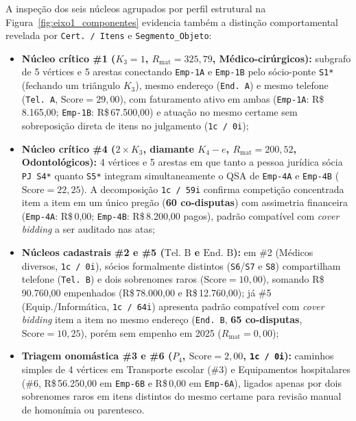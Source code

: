 A inspeção dos seis núcleos agrupados por perfil estrutural na Figura~\ref{fig:eixo1_componentes} evidencia também a distinção comportamental revelada por \texttt{Cert.~/~Itens} e \texttt{Segmento\_\allowbreak Objeto}:
\begin{itemize}
  \item \textbf{Núcleo crítico \#1 ($K_3=1$, $R_{\text{mat}}=325{,}79$, Médico-cirúrgicos):} subgrafo de 5 vértices e 5 arestas conectando \texttt{Emp-1A} e \texttt{Emp-1B} pelo sócio-ponte \texttt{S1*} (fechando um triângulo $K_3$), mesmo endereço (\texttt{End.~A}) e mesmo telefone (\texttt{Tel.~A}, $\text{Score}=29{,}00$), com faturamento ativo em ambas (\texttt{Emp-1A}: R\$\,8.165,00; \texttt{Emp-1B}: R\$\,67.500,00) e atuação no mesmo certame sem sobreposição direta de itens no julgamento (\texttt{1c / 0i});
  \item \textbf{Núcleo crítico \#4 ($2\times K_3$, diamante $K_4-e$, $R_{\text{mat}}=200{,}52$, Odontológicos):} 4 vértices e 5 arestas em que tanto a pessoa jurídica sócia \texttt{PJ S4*} quanto \texttt{S5*} integram simultaneamente o QSA de \texttt{Emp-4A} e \texttt{Emp-4B} ($\text{Score}=22{,}25$). A decomposição \texttt{1c / 59i} confirma competição concentrada item a item em um único pregão (\textbf{60 co-disputas}) com assimetria financeira (\texttt{Emp-4A}: R\$\,0,00; \texttt{Emp-4B}: R\$\,8.200,00 pagos), padrão compatível com \textit{cover bidding} a ser auditado nas atas;
  \item \textbf{Núcleos cadastrais \#2 e \#5 ($\text{Tel.~B}$ e $\text{End.~B}$):} em \#2 (Médicos diversos, \texttt{1c / 0i}), sócios formalmente distintos (\texttt{S6}/\texttt{S7} e \texttt{S8}) compartilham telefone (\texttt{Tel.~B}) e dois sobrenomes raros ($\text{Score}=10{,}00$), somando R\$\,90.760,00 empenhados (R\$\,78.000,00 e R\$\,12.760,00); já \#5 (Equip./Informática, \texttt{1c / 64i}) apresenta padrão compatível com \textit{cover bidding} item a item no mesmo endereço (\texttt{End.~B}, \textbf{65 co-disputas}, $\text{Score}=10{,}25$), porém sem empenho em 2025 ($R_{\text{mat}}=0{,}00$);
  \item \textbf{Triagem onomástica \#3 e \#6 ($P_4$, $\text{Score}=2{,}00$, \texttt{1c / 0i}):} caminhos simples de 4 vértices em Transporte escolar (\#3) e Equipamentos hospitalares (\#6, R\$\,56.250,00 em \texttt{Emp-6B} e R\$\,0,00 em \texttt{Emp-6A}), ligados apenas por dois sobrenomes raros em itens distintos do mesmo certame para revisão manual de homonímia ou parentesco.
\end{itemize}

